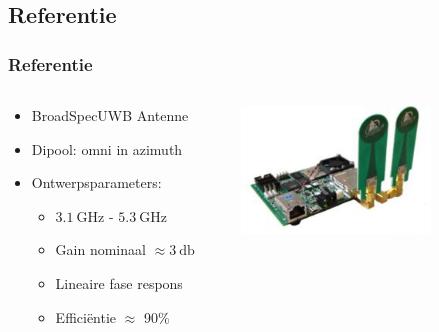 \documentclass{beamer}
\begin{document}
\subsection{Referentie}
  \begin{frame}
  \frametitle{Referentie}
  \begin{columns}[c]
  \begin{column}{0.5\textwidth}
    \begin{itemize}
      \item BroadSpec\texttrademark  UWB Antenne 
      \item Dipool: omni in azimuth
      \item Ontwerpsparameters:
      \begin{itemize}
        \item $\SI{3.1}{\giga\hertz}$ - $\SI{5.3}{\giga\hertz}$
        \item Gain nominaal $\approx \SI{3}{\decibel}$ 
        \item Lineaire fase respons
        \item Effici\"entie $\approx$ 90\%
      \end{itemize}
    \end{itemize}
    \end{column}

    \begin{column}{0.5\textwidth}
    \centering
      \includegraphics[width=0.7\textwidth]{images/Pulson400UWB.jpg}
    \end{column}
    \end{columns}

  \end{frame}
\end{document}
